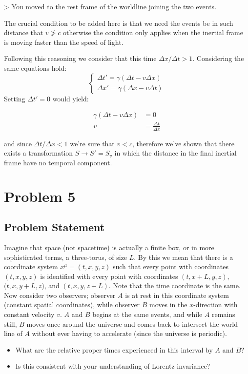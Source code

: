 \documentclass[10pt,twocoloumn]{article}
\begin{document}
> You moved to the rest frame of the worldline joining the two events.

The crucial condition to be added here is that we need the events be in such distance that $v \not > c$ otherwise the condition only applies when the inertial frame is moving faster than the speed of light.

Following this reasoning we consider that this time $\Delta x / \Delta t >1$. Considering the same equations hold:
\begin{equation}
\begin{cases}
\Delta t' = \gamma(\Delta t  - v \Delta x) \\
\Delta x' = \gamma (\Delta x - v \Delta t)
\end{cases}
\end{equation}
Setting $\Delta t'=0$ would yield:

\begin{align}
\gamma(\Delta t - v\Delta x) &= 0\\
v &= \frac{\Delta t}{\Delta x}
\end{align}

and since $\Delta t / \Delta x < 1$ we're sure that $v < c$, therefore we've shown that there exists a transformation $S \rightarrow S' = S_v$ in which the distance in the final inertial frame have no temporal component.
\section*{Problem 5}
\subsection*{Problem Statement}
Imagine that space (not spacetime) is actually a finite box, or in more sophisticated terms, a three-torus, of size $L$. By this we mean that there is a coordinate system $x^\mu = (t,x,y,z)$ such that every point with coordinates $(t,x,y,z)$ is identified with every point with coordinates $(t,x+L,y,z)$, $(t,x,y+L,z$), and $(t,x,y,z+L)$. Note that the time coordinate is the same. Now consider two observers; observer $A$ is at rest in this coordinate system (constant spatial coordinates), while observer $B$ moves in the $x$-direction with constant velocity $v$. $A$ and $B$ begins at the same events, and while $A$ remains still, $B$ moves once around the universe and comes back to intersect the world-line of $A$ without ever having to accelerate (since the universe is periodic).
\begin{itemize}
\item What are the relative proper times experienced in this interval by $A$ and $B$?
\item Is this consistent with your understanding of Lorentz invariance?
\end{itemize}
\end{document}
